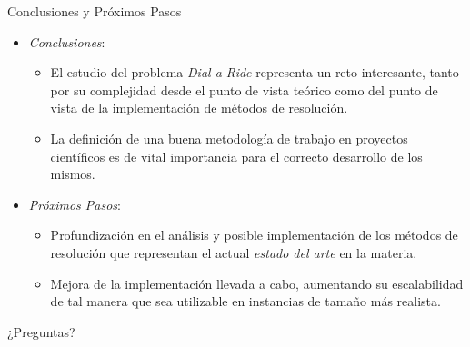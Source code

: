 \documentclass[8pt]{beamer}
\begin{document}
  \begin{frame}{Conclusiones y Próximos Pasos}
    \begin{itemize}
      \item \emph{Conclusiones}:
        \begin{itemize}
          \item El estudio del problema \emph{Dial-a-Ride} representa un reto interesante, tanto por su complejidad desde el punto de vista teórico como del punto de vista de la implementación de métodos de resolución.

          \item La definición de una buena metodología de trabajo en proyectos científicos es de vital importancia para el correcto desarrollo de los mismos.

        \end{itemize}
      \item \emph{Próximos Pasos}:
        \begin{itemize}

          \item Profundización en el análisis y posible implementación de los métodos de resolución que representan el actual \emph{estado del arte} en la materia.

          \item Mejora de la implementación llevada a cabo, aumentando su escalabilidad de tal manera que sea utilizable en instancias de tamaño más realista.

        \end{itemize}
    \end{itemize}
  \end{frame}

  \begin{frame}
    \begin{center}
      \begin{huge}
        ¿Preguntas?
      \end{huge}
    \end{center}
	\end{frame}
\end{document}
